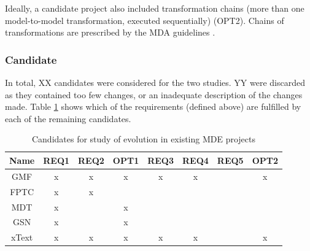 Ideally, a candidate project also included transformation chains (more than one model-to-model transformation, executed sequentially) (OPT2). Chains of transformations are prescribed by the MDA guidelines \cite{kleppe03mda}.


\subsubsection{Candidate} %
\label{ssub:candidate}
In total, XX candidates were considered for the two studies. YY were discarded as they contained too few changes, or an inadequate description of the changes made. Table \ref{tab:candidates} shows which of the requirements (defined above) are fulfilled by each of the remaining candidates.

\begin{table}
	\caption{Candidates for study of evolution in existing MDE projects}
	\centering
	\begin{tabular}{|c||c|c|c||c|c|c|c|}
		\hline
		Name  & REQ1 & REQ2 & OPT1 & REQ3 & REQ4 & REQ5 & OPT2 \\
		\hline
		GMF   & x    & x    & x    & x    & x    &      & x    \\
		\hline
		FPTC  & x    & x    &      &      &      &      &      \\
		\hline
		MDT   & x    &      & x    &      &      &      &      \\
		\hline
		GSN   & x    &      & x    &      &      &      &      \\
		\hline
		xText & x    & x    & x    & x    & x    &      & x    \\
		\hline
	\end{tabular}
	\label{tab:candidates}
\end{table}

